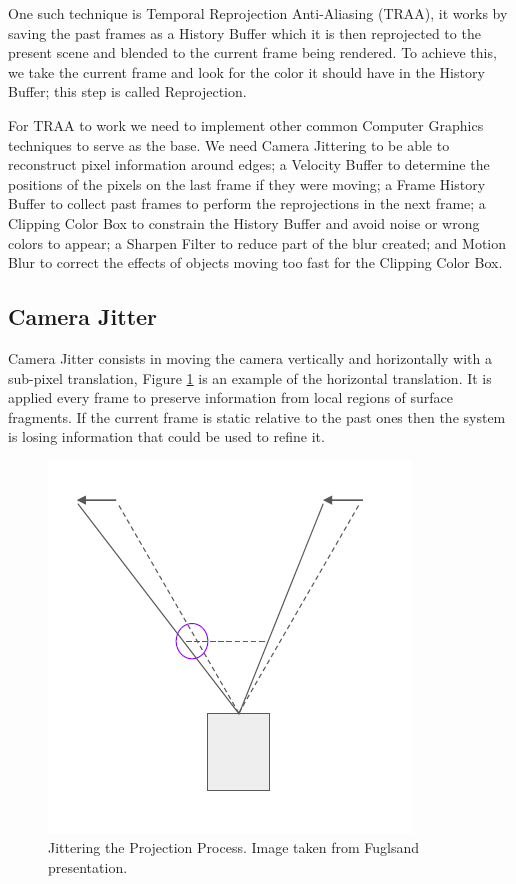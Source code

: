 \documentclass{cslthse-msc}
\begin{document}
One such technique is Temporal Reprojection Anti-Aliasing (TRAA), it works by saving the past frames as a History Buffer which it is then reprojected to the present scene and blended to the current frame being rendered.  To achieve this, we take the current frame and look for the color it should have in the History Buffer; this step is called Reprojection.

For TRAA to work we need to implement other common Computer Graphics techniques to serve as the base. We need Camera Jittering to be able to reconstruct pixel information around edges; a Velocity Buffer to determine the positions of the pixels on the last frame if they were moving; a Frame History Buffer to collect past frames to perform the reprojections in the next frame; a Clipping Color Box to constrain the History Buffer and avoid noise or wrong colors to appear; a Sharpen Filter to reduce part of the blur created; and Motion Blur to correct the effects of objects moving too fast for the Clipping Color Box.

\subsection{Camera Jitter}
Camera Jitter consists in moving the camera vertically and horizontally with a sub-pixel translation, Figure \ref{fig:camerajittering} is an example of the horizontal translation. It is applied every frame to preserve information from local regions of surface fragments. If the current frame is static relative to the past ones then the system is losing information that could be used to refine it. ~\cite{Fuglsand2016,XU2016}

\begin{figure}[!hbt]
	\centering
	\includegraphics[scale=0.3]{images/camera_jitter.png}
	\caption{Jittering the Projection Process. Image taken from Fuglsand presentation. \protect\cite{Fuglsand2016}}\label{fig:camerajittering}
\end{figure}
\end{document}
